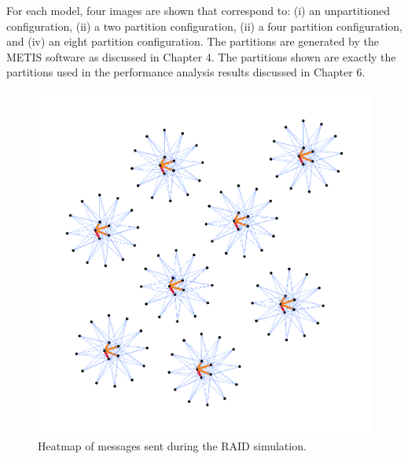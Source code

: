 \documentclass[11pt]{book}
\begin{document}
\noindent

For each model, four images are shown that correspond to: (i) an unpartitioned configuration, (ii) a two partition configuration, (ii) a four partition configuration, and (iv) an eight partition configuration. The partitions are generated by the METIS software as discussed in Chapter 4. The partitions shown are exactly the partitions used in the performance analysis results discussed in Chapter 6.

\begin{figure}
\centering
\includegraphics[width=\textwidth,height=0.9\textheight,keepaspectratio]{figs/RAID}
\caption{Heatmap of messages sent during the RAID simulation.}
\end{figure}
\end{document}
